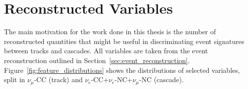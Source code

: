 \section{Reconstructed Variables} \label{sec:interesting_variables}

The main motivation for the work done in this thesis is the number of reconstructed quantities that might be useful in discriminating event signatures between tracks and cascades.
All variables are taken from the event reconstruction outlined in Section~\ref{sec:event_reconstruction}.
Figure~\ref{fig:feature_distributions} shows the distributions of selected variables, split in $\nu_\mu$-CC (track) and $\nu_e$-CC+$\nu_e$-NC+$\nu_\mu$-NC (cascade).

\begin{figure}[h] 
    \centering
    

\end{figure}
